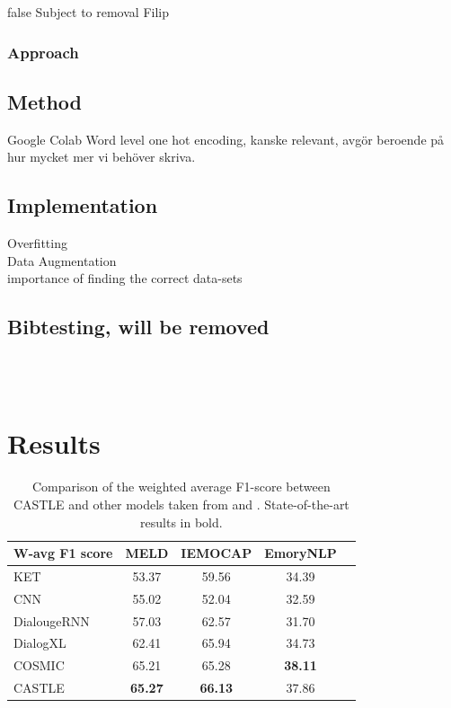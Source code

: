 \documentclass[nofilelist]{cslthse-msc}
\begin{document}








\ifx false
Subject to removal
Filip
\subsection{Approach} 
\section{Method}
Google Colab
Word level one hot encoding, kanske relevant, avgör beroende på hur mycket mer vi behöver skriva.
\section{Implementation}
Overfitting \\
Data Augmentation \\
importance of finding the correct data-sets \\
\section{Bibtesting, will be removed}
\citep{emotionlinesdataset} \\
\citep{franoischollet2017learning}\\
\citep{beaver2020towards}

\fi

\chapter{Results}
\label{result_chapter}

\begin{table}[!ht]
\begin{center}
\begin{tabular}{lcccc}
\hline
\textbf{W-avg F1 score} & \textbf{MELD}           & \textbf{IEMOCAP}        & \textbf{EmoryNLP}  \\ \hline
KET                     & 53.37           & 59.56          & 34.39 \\
CNN                     & 55.02           & 52.04          & 32.59 \\
DialougeRNN             & 57.03           & 62.57          & 31.70 \\
DialogXL                & 62.41           & 65.94          & 34.73 \\
COSMIC                  & 65.21           & 65.28          & \textbf{38.11} \\ \hline
CASTLE                  & \textbf{65.27} & \textbf{66.13} & 37.86\\ \hline
\end{tabular}
\end{center}
\caption{Comparison of the weighted average F1-score between CASTLE and other models taken from \citet{ghosal2020cosmic} and \citet{Shen2020DialogXLAX}. State-of-the-art results in bold. }
\label{results_table}
\end{table}
\end{document}
